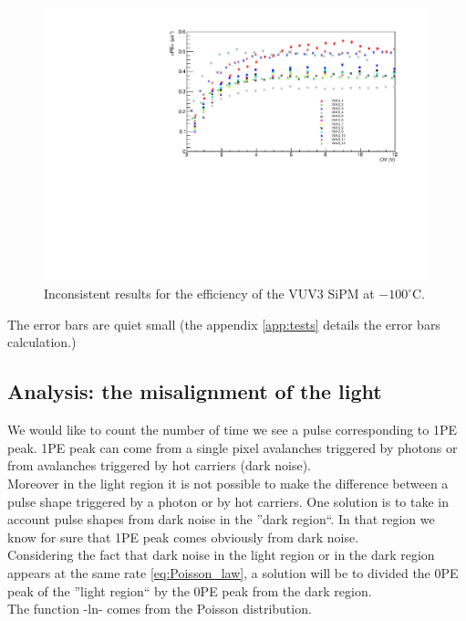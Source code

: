 \documentclass[a4paper, 11pt]{report}%
\begin{document}
  \begin{figure}[!hbtp]
  \centering
  \includegraphics[totalheight=0.5\textwidth,trim=0.5cm 0cm 1.8cm 0.5cm, clip=true]{../Pictures/VUV3_paul.pdf}
  \caption{Inconsistent results for the efficiency of the VUV3 SiPM at $-100^\circ$C.}
  \label{fig:issue}
  \end{figure}
  
  The error bars are quiet small (the appendix \ref{app:tests} details the error bars calculation.) 
  
  \subsection{Analysis: the misalignment of the light}
  
  We would like to count the number of time we see a pulse corresponding to 1PE peak. 1PE peak can come from a single pixel 
  avalanches triggered by photons or from avalanches triggered by hot carriers (dark noise).\\
  Moreover in the light region it is not possible to make the difference between a pulse shape triggered by a photon or by hot carriers. 
  One solution is to take in account pulse shapes from dark noise in the ''dark region``.
  In that region we know for sure that 1PE peak comes obviously from dark noise.\\
  Considering the fact that dark noise in the light region or in the dark region appears at the same rate \ref{eq:Poisson_law},
  a solution will be to divided the 0PE peak of the ''light region`` by the 0PE peak from the dark region.\\
  The function -ln- comes from the Poisson distribution.
  \\
  
\end{document}
